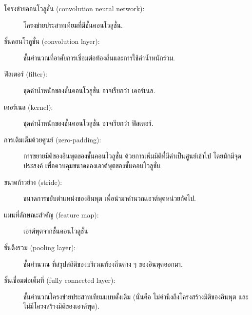 \begin{description}

	\item[โครงข่ายคอนโวลูชั่น (convolution neural network):]
โครงข่ายประสาทเทียมที่มีชั้นคอนโวลูชั่น.

	\item[ชั้นคอนโวลูชั่น (convolution layer):]
	ชั้นคำนวณที่อาศัยการเชื่อมต่อท้องถิ่นและการใช้ค่าน้ำหนักร่วม.
	
	\item[ฟิลเตอร์ (filter):]
	ชุดค่าน้ำหนักของชั้นคอนโวลูชั่น
	อาจเรียกว่า เคอร์เนล.
	
	\item[เคอร์เนล (kernel):]
	ชุดค่าน้ำหนักของชั้นคอนโวลูชั่น
อาจเรียกว่า ฟิลเตอร์.
	
	\item[การเติมเต็มด้วยศูนย์ (zero-padding):]
	การขยายมิติของอินพุตของชั้นคอนโวลูชั่น
	ด้วยการเพิ่มมิติที่มีค่าเป็นศูนย์เข้าไป
	โดยมักมีจุดประสงค์ เพื่อควบคุมขนาดของเอาต์พุตของชั้นคอนโวลูชั่น
	
	\item[ขนาดก้าวย่าง (stride):]
	ขนาดการขยับตำแหน่งของอินพุต เพื่อนำมาคำนวณเอาต์พุตหน่วยถัดไป.

	\item[แผนที่ลักษณะสำคัญ (feature map):]
	เอาต์พุตจากชั้นคอนโวลูชั่น
	
	\item[ชั้นดึงรวม (pooling layer):]
	ชั้นคำนวณ ที่สรุปสถิติของบริเวณท้องถิ่นต่าง ๆ ของอินพุตออกมา.
	
	\item[ชั้นเชื่อมต่อเต็มที่ (fully connected layer):]
	ชั้นคำนวณโครงข่ายประสาทเทียมแบบดั้งเดิม (นั่นคือ ไม่คำนึงถึงโครงสร้างมิติของอินพุต และไม่มีโครงสร้างมิติของเอาต์พุต).
	
\end{description}


